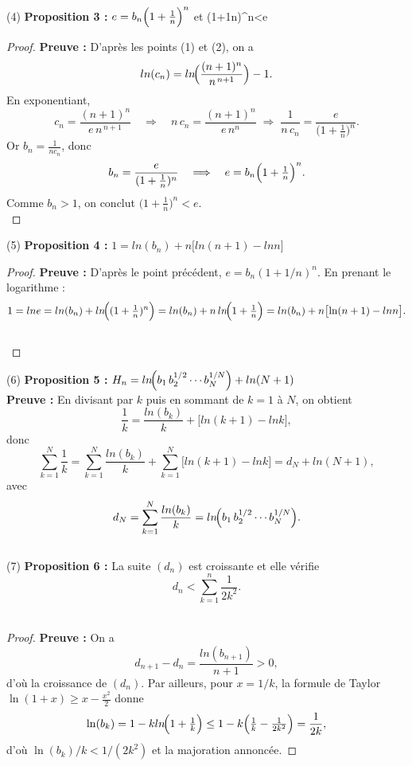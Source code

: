 \documentclass[a4paper,12pt]{article}
\begin{document}
(4) \textbf{Proposition 3 : }$e = b_n\Bigl(1+\tfrac1n\Bigr)^n$ et \bigl(1+\tfrac1n\bigr)^n<e\ \\

\begin{proof}
\textbf{Preuve : }
D’après les points (1) et (2), on a
\[
ln(c_n)
=ln\!\Bigl(\frac{(n+1)^n}{n^{\,n+1}}\Bigr)-1.
\]
En exponentiant,
\[
c_n
=\frac{(n+1)^n}{e\,n^{\,n+1}}
\quad\Longrightarrow\quad
n\,c_n=\frac{(n+1)^n}{e\,n^n}
\;\Longrightarrow\;
\frac1{n\,c_n}
=\frac{e}{\bigl(1+\tfrac1n\bigr)^n}.
\]
Or \(b_n=\frac{1}{nc_n}\), donc
\[
b_n=\frac{e}{(1+\tfrac1n)^n}
\quad\Longrightarrow\quad
e = b_n\Bigl(1+\tfrac1n\Bigr)^n.
\]
Comme \(b_n>1\), on conclut \(\bigl(1+\tfrac1n\bigr)^n<e\). \\
\end{proof}
(5) \textbf{Proposition 4 : } $1 = ln(b_n) + n\bigl[ln(n+1) - ln n\bigr]$ \\

\begin{proof}
\textbf{Preuve : }
D’après le point précédent, \(e=b_n(1+1/n)^n\). En prenant le logarithme :
\[
1 = ln e = ln(b_n)+ln\!\Bigl((1+\tfrac1n)^n\Bigr)
= ln(b_n) + n\,ln\!\Bigl(1+\tfrac1n\Bigr)
= ln(b_n) + n\bigl[\ln(n+1)-ln n\bigr].
\] \\
\end{proof}

(6) \textbf{Proposition 5 : }$H_n=ln\!\Bigl(b_1\,b_2^{1/2}\cdots b_N^{1/N}\Bigr) + ln(N+1)$ \\

\textbf{Preuve : } En divisant par \(k\) puis en sommant de \(k=1\) à \(N\), on obtient
\[
\frac1k = \frac{ln(b_k)}{k} + \bigl[ln(k+1)-ln k\bigr],
\]
donc
\[
\sum_{k=1}^N\frac1k
= \sum_{k=1}^N\frac{ln(b_k)}{k}
  + \sum_{k=1}^N\bigl[ln(k+1)-ln k\bigr]
= d_N + ln(N+1),
\]
avec
\[
d_N=\sum_{k=1}^N\frac{ln(b_k)}{k}
=ln\!\Bigl(b_1\,b_2^{1/2}\cdots b_N^{1/N}\Bigr).
\] \\

(7) \textbf{Proposition 6 : }La suite \((d_n)\) est croissante et elle vérifie
\[
d_n < \sum_{k=1}^n \frac{1}{2k^2}.
\] \\ 
\begin{proof}
\textbf{Preuve : }
On a
\[
d_{n+1}-d_n = \frac{ln(b_{n+1})}{n+1}>0,
\]
d’où la croissance de \((d_n)\).  
Par ailleurs, pour \(x=1/k\), la formule de Taylor \(\ln(1+x)\ge x-\tfrac{x^2}{2}\) donne
\[
\ln(b_k)
=1 - kln\!\Bigl(1+\tfrac1k\Bigr)
\le 1 - k\Bigl(\tfrac1k - \tfrac1{2k^2}\Bigr)
= \frac1{2k},
\]
d’où \(\ln(b_k)/k<1/(2k^2)\) et la majoration annoncée.
\end{proof} \\
\end{document}
